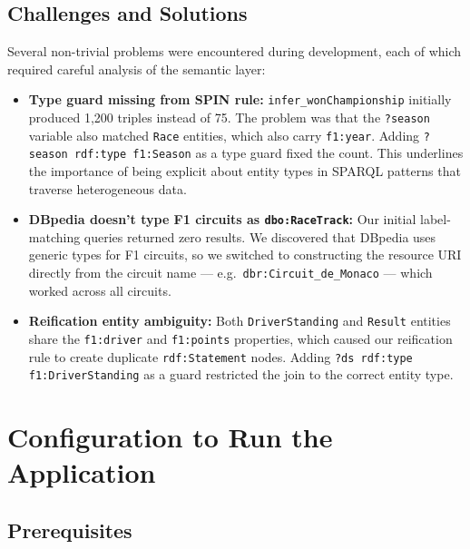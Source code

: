 \documentclass[12pt,a4paper]{article}
\begin{document}
\subsection{Challenges and Solutions}

Several non-trivial problems were encountered during development, each of which
required careful analysis of the semantic layer:

\begin{itemize}[leftmargin=1.5em]
  \item \textbf{Type guard missing from SPIN rule:} \texttt{infer\_wonChampionship}
        initially produced 1{,}200 triples instead of 75. The problem was that the
        \texttt{?season} variable also matched \texttt{Race} entities, which also
        carry \texttt{f1:year}. Adding \texttt{?season rdf:type f1:Season} as a
        type guard fixed the count. This underlines the importance of being explicit
        about entity types in SPARQL patterns that traverse heterogeneous data.
  \item \textbf{DBpedia doesn't type F1 circuits as \texttt{dbo:RaceTrack}:}
        Our initial label-matching queries returned zero results. We discovered that
        DBpedia uses generic types for F1 circuits, so we switched to constructing
        the resource URI directly from the circuit name ---
        e.g.\ \texttt{dbr:Circuit\_de\_Monaco} --- which worked across all circuits.
  \item \textbf{Reification entity ambiguity:} Both \texttt{DriverStanding} and
        \texttt{Result} entities share the \texttt{f1:driver} and \texttt{f1:points}
        properties, which caused our reification rule to create duplicate
        \texttt{rdf:Statement} nodes. Adding \texttt{?ds rdf:type f1:DriverStanding}
        as a guard restricted the join to the correct entity type.

\end{itemize}

\section{Configuration to Run the Application}

\subsection{Prerequisites}
\end{document}
